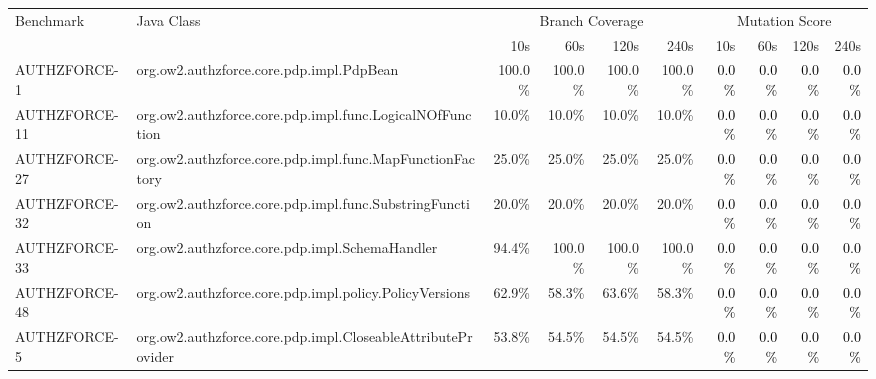 \begin{tabular}{ ll rrrr rrrr}\toprule 
 \multirow{2}{1in}{Benchmark} & \multirow{2}{1in}{Java Class} &  \multicolumn{4}{c}{Branch Coverage} &  \multicolumn{4}{c}{Mutation Score}\\\cmidrule(lr){3-6}\cmidrule(lr){7-10} 
 & & 10s & 60s & 120s & 240s & 10s & 60s & 120s & 240s \\ 
\midrule 
AUTHZFORCE-1  &  org.ow2.authzforce.core.pdp.impl.PdpBean & 100.0\% & 100.0\% & 100.0\% & 100.0\% & \cellcolor{light-gray} \textcolor{black}{0.0\%} & \cellcolor{light-gray} \textcolor{black}{0.0\%} & \cellcolor{light-gray} \textcolor{black}{0.0\%} & \cellcolor{light-gray} \textcolor{black}{0.0\%}\\ 
AUTHZFORCE-11  &  org.ow2.authzforce.core.pdp.impl.func.LogicalNOfFunction & 10.0\% & 10.0\% & 10.0\% & 10.0\% & \cellcolor{light-gray} \textcolor{black}{0.0\%} & \cellcolor{light-gray} \textcolor{black}{0.0\%} & \cellcolor{light-gray} \textcolor{black}{0.0\%} & \cellcolor{light-gray} \textcolor{black}{0.0\%}\\ 
AUTHZFORCE-27  &  org.ow2.authzforce.core.pdp.impl.func.MapFunctionFactory & 25.0\% & 25.0\% & 25.0\% & 25.0\% & \cellcolor{light-gray} \textcolor{black}{0.0\%} & \cellcolor{light-gray} \textcolor{black}{0.0\%} & \cellcolor{light-gray} \textcolor{black}{0.0\%} & \cellcolor{light-gray} \textcolor{black}{0.0\%}\\ 
AUTHZFORCE-32  &  org.ow2.authzforce.core.pdp.impl.func.SubstringFunction & 20.0\% & 20.0\% & 20.0\% & 20.0\% & \cellcolor{light-gray} \textcolor{black}{0.0\%} & \cellcolor{light-gray} \textcolor{black}{0.0\%} & \cellcolor{light-gray} \textcolor{black}{0.0\%} & \cellcolor{light-gray} \textcolor{black}{0.0\%}\\ 
AUTHZFORCE-33  &  org.ow2.authzforce.core.pdp.impl.SchemaHandler & 94.4\% & 100.0\% & 100.0\% & 100.0\% & \cellcolor{light-gray} \textcolor{black}{0.0\%} & \cellcolor{light-gray} \textcolor{black}{0.0\%} & \cellcolor{light-gray} \textcolor{black}{0.0\%} & \cellcolor{light-gray} \textcolor{black}{0.0\%}\\ 
AUTHZFORCE-48  &  org.ow2.authzforce.core.pdp.impl.policy.PolicyVersions & 62.9\% & 58.3\% & 63.6\% & 58.3\% & \cellcolor{light-gray} \textcolor{black}{0.0\%} & \cellcolor{light-gray} \textcolor{black}{0.0\%} & \cellcolor{light-gray} \textcolor{black}{0.0\%} & \cellcolor{light-gray} \textcolor{black}{0.0\%}\\ 
AUTHZFORCE-5  &  org.ow2.authzforce.core.pdp.impl.CloseableAttributeProvider & 53.8\% & 54.5\% & 54.5\% & 54.5\% & \cellcolor{light-gray} \textcolor{black}{0.0\%} & \cellcolor{light-gray} \textcolor{black}{0.0\%} & \cellcolor{light-gray} \textcolor{black}{0.0\%} & \cellcolor{light-gray} \textcolor{black}{0.0\%}\\ 

\end{tabular}
